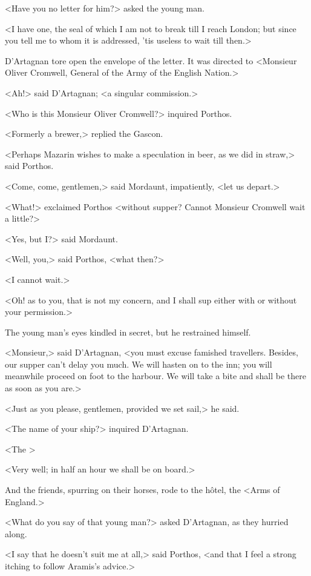 <Have you no letter for him?> asked the young man.

<I have one, the seal of which I am not to break till I reach London; but since you tell me to whom it is addressed, 'tis useless to wait till then.>

D'Artagnan tore open the envelope of the letter. It was directed to <Monsieur Oliver Cromwell, General of the Army of the English Nation.>

<Ah!> said D'Artagnan; <a singular commission.>

<Who is this Monsieur Oliver Cromwell?> inquired Porthos.

<Formerly a brewer,> replied the Gascon.

<Perhaps Mazarin wishes to make a speculation in beer, as we did in straw,> said Porthos.

<Come, come, gentlemen,> said Mordaunt, impatiently, <let us depart.>

<What!> exclaimed Porthos <without supper? Cannot Monsieur Cromwell wait a little?>

<Yes, but I?> said Mordaunt.

<Well, you,> said Porthos, <what then?>

<I cannot wait.>

<Oh! as to you, that is not my concern, and I shall sup either with or without your permission.>

The young man's eyes kindled in secret, but he restrained himself.

<Monsieur,> said D'Artagnan, <you must excuse famished travellers. Besides, our supper can't delay you much. We will hasten on to the inn; you will meanwhile proceed on foot to the harbour. We will take a bite and shall be there as soon as you are.>

<Just as you please, gentlemen, provided we set sail,> he said.

<The name of your ship?> inquired D'Artagnan.

<The >

<Very well; in half an hour we shall be on board.>

And the friends, spurring on their horses, rode to the hôtel, the <Arms of England.>

<What do you say of that young man?> asked D'Artagnan, as they hurried along.

<I say that he doesn't suit me at all,> said Porthos, <and that I feel a strong itching to follow Aramis's advice.>

